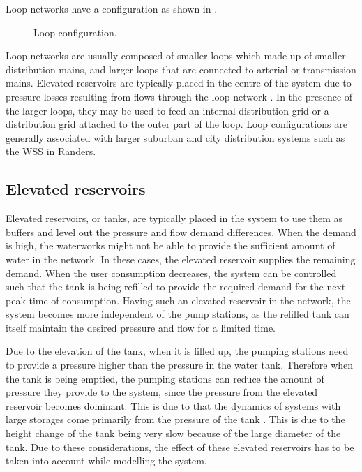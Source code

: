 Loop networks have a configuration as shown in . 

\begin{figure}[H]
\centering
 
\caption{Loop configuration.}
\label{fig:loop_configuration}
\end{figure}

Loop networks are usually composed of smaller loops which made up of smaller distribution mains, and larger loops that are connected to arterial or transmission mains. Elevated reservoirs are typically placed in the centre of the system due to pressure losses resulting from flows through the loop network \cite{council2007drinking}. In the presence of the larger loops, they may be used to feed an internal distribution grid or a distribution grid attached to the outer part of the loop. Loop configurations are generally associated with larger suburban and city distribution systems such as the WSS in Randers\cite{council2007drinking}. 

\subsection{Elevated reservoirs}
\label{elevated_reservoirs}

Elevated reservoirs, or tanks, are typically placed in the system to use them as buffers and level out the pressure and flow demand differences. When the demand is high, the waterworks might not be able to provide the sufficient amount of water in the network. In these cases, the elevated reservoir supplies the remaining demand. When the user consumption decreases, the system can be controlled such that the tank is being refilled to provide the required demand for the next peak time of consumption. Having such an elevated reservoir in the network, the system becomes more independent of the pump stations, as the refilled tank can itself maintain the desired pressure and flow for a limited time. 

Due to the elevation of the tank, when it is filled up, the pumping stations need to provide a pressure higher than the pressure in the water tank. Therefore when the tank is being emptied, the pumping stations can reduce the amount of pressure they provide to the system, since the pressure from the elevated reservoir becomes dominant. This is due to that the dynamics of systems with large storages come primarily from the pressure of the tank \cite{8thsemester_project}. This is due to the height change of the tank being very slow because of the large diameter of the tank. Due to these considerations, the effect of these elevated reservoirs has to be taken into account while modelling the system. 

